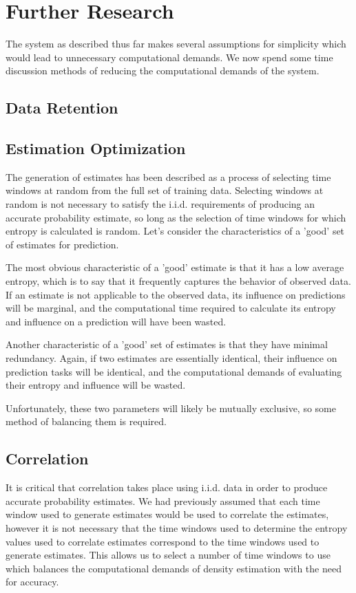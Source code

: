 \documentclass[10pt]{article}
\begin{document}
\section{Further Research}
The system as described thus far makes several assumptions for simplicity which would lead to unnecessary computational demands.  We now spend some time discussion methods of reducing the computational demands of the system.  

\subsection{Data Retention}

\subsection{Estimation Optimization}
The generation of estimates has been described as a process of selecting time windows at random from the full set of training data.  Selecting windows at random is not necessary to satisfy the i.i.d. requirements of producing an accurate probability estimate, so long as the selection of time windows for which entropy is calculated is random.  Let's consider the characteristics of a 'good' set of estimates for prediction.  

The most obvious characteristic of a 'good' estimate is that it has a low average entropy, which is to say that it frequently captures the behavior of observed data.  If an estimate is not applicable to the observed data, its influence on predictions will be marginal, and the computational time required to calculate its entropy and influence on a prediction will have been wasted.  

Another characteristic of a 'good' set of estimates is that they have minimal redundancy.  Again, if two estimates are essentially identical, their influence on prediction tasks will be identical, and the computational demands of evaluating their entropy and influence will be wasted. 

Unfortunately, these two parameters will likely be mutually exclusive, so some method of balancing them is required.

\subsection{Correlation}
It is critical that correlation takes place using i.i.d. data in order to produce accurate probability estimates.  We had previously assumed that each time window used to generate estimates would be used to correlate the estimates, however it is not necessary that the time windows used to determine the entropy values used to correlate estimates correspond to the time windows used to generate estimates.  This allows us to select a number of time windows to use which balances the computational demands of density estimation with the need for accuracy.
\end{document}
